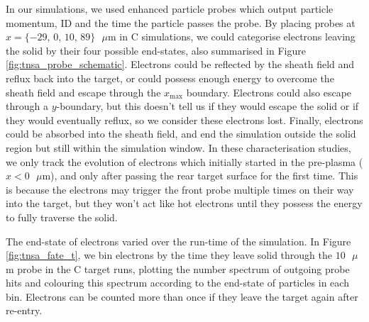 \documentclass[12pt]{article}
\numberwithin{equation}{section}
\begin{document}
In our simulations, we used enhanced particle probes which output particle momentum, ID and the time the particle passes the probe. By placing probes at $x = \{-29\text{, }0\text{, }10\text{, }89\}\text{ }\mu$m in C simulations, we could categorise electrons leaving the solid by their four possible end-states, also summarised in Figure \ref{fig:tnsa_probe_schematic}. Electrons could be reflected by the sheath field and reflux back into the target, or could possess enough energy to overcome the sheath field and escape through the $x_\text{max}$ boundary. Electrons could also escape through a $y$-boundary, but this doesn't tell us if they would escape the solid or if they would eventually reflux, so we consider these electrons lost. Finally, electrons could be absorbed into the sheath field, and end the simulation outside the solid region but still within the simulation window. In these characterisation studies, we only track the evolution of electrons which initially started in the pre-plasma ($x<0\text{ }\mu$m), and only after passing the rear target surface for the first time. This is because the electrons may trigger the front probe multiple times on their way into the target, but they won't act like hot electrons until they possess the energy to fully traverse the solid.

The end-state of electrons varied over the run-time of the simulation. In Figure \ref{fig:tnsa_fate_t}, we bin electrons by the time they leave solid through the $10\text{ }\mu$m probe in the C target runs, plotting the number spectrum of outgoing probe hits and colouring this spectrum according to the end-state of particles in each bin. Electrons can be counted more than once if they leave the target again after re-entry.
\end{document}
